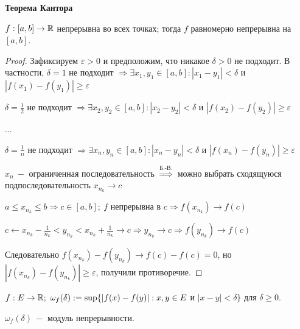 \begin{theorem} \textbf{Теорема Кантора}

$f:[a,b]\rightarrow \mathbb{R}$ непрерывна во всех точках; тогда $f$ равномерно непрерывна на $[a,b]$.
\end{theorem}

\begin{proof}
    Зафиксируем $\varepsilon>0$ и предположим, что никакое $\delta>0$ не подходит. В частности, $\delta =1$ не подходит $\Rightarrow \exists x_1,y_1\in [a,b]: |x_1-y_1|<\delta$ и $|f(x_1)-f(y_1)|\geq \varepsilon$

    $\delta =\frac{1}{2}$ не подходит $\Rightarrow \exists x_2,y_2\in [a,b]: |x_2-y_2|<\delta$ и $|f(x_2)-f(y_2)|\geq \varepsilon$

    ...

    $\delta =\frac{1}{n}$ не подходит $\Rightarrow \exists x_n,y_n\in [a,b]: |x_n-y_n|<\delta$ и $|f(x_n)-f(y_n)|\geq \varepsilon$

    $x_n\ -$ ограниченная последовательность $\overset{\text{Б.-В.}}{\Rightarrow} $ можно выбрать сходящуюся подпоследовательность $x_{n_k}\rightarrow c$

    $a\leq x_{n_k}\leq b\Rightarrow c\in [a,b];\ f$ непрерывна в $c\Rightarrow f(x_{n_k})\rightarrow f(c)$

    $c\leftarrow x_{n_k}-\frac{1}{n_k}< y_{n_k}<x_{n_k}+\frac{1}{n_k}\rightarrow c\Rightarrow y_{n_k}\rightarrow c\Rightarrow f(y_{n_k})\rightarrow f(c)$

    Следовательно $f(x_{n_k})-f(y_{n_k})\rightarrow f(c)-f(c)=0$, но $|f(x_{n_k})-f(y_{n_k})|\geq \varepsilon$, получили противоречие.
\end{proof}

\begin{definition}
    $f:E\rightarrow \mathbb{R};\ \omega_f(\delta):=\sup \{|f(x)-f(y)| : x,y\in E $ и $ |x-y|<\delta \}$ для $\delta\geq 0$.

    $\omega_f(\delta)\ -$ модуль непрерывности.
\end{definition}

